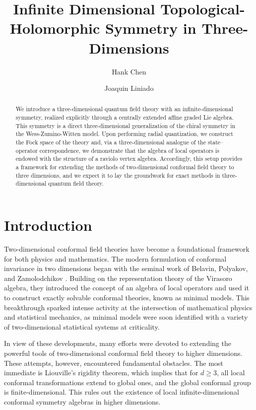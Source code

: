 \documentclass[11pt]{amsart}
\date{}
\title{Infinite Dimensional Topological-Holomorphic Symmetry in Three-Dimensions}
\author{Hank Chen}
\author{Joaquin Liniado}
\numberwithin{equation}{section}
\numberwithin{figure}{section}
\numberwithin{table}{section}
\theoremstyle{thm}
\numberwithin{equation}{subsection}
\theoremstyle{definition}
\theoremstyle{rem}
\begin{document}
	
\begin{abstract}

We introduce a three-dimensional quantum field theory with an infinite-dimensional symmetry, realized explicitly through a centrally extended affine graded Lie algebra. This symmetry is a direct three-dimensional generalization of the chiral symmetry in the Wess-Zumino-Witten model. Upon performing radial quantization, we construct the Fock space of the theory and, via a three-dimensional analogue of the state–operator correspondence, we demonstrate that the algebra of local operators is endowed with the structure of a raviolo vertex algebra. Accordingly, this setup provides a framework for extending the methods of two-dimensional conformal field theory to three dimensions, and we expect it to lay the groundwork for exact methods in three-dimensional quantum field theory.
	
\end{abstract}



\maketitle

\tableofcontents





\section{Introduction}

Two-dimensional conformal field theories have become a foundational framework for both physics and mathematics. The modern formulation of conformal invariance in two dimensions began with the seminal  work of Belavin, Polyakov, and Zamolodchikov \cite{Belavin:1984vu}. Building on the representation theory of the Virasoro algebra, they introduced the concept of an algebra of local operators and used it to construct exactly solvable conformal theories, known as minimal models. This breakthrough sparked intense activity at the intersection of mathematical physics and statistical mechanics, as minimal models were soon identified with a variety of two-dimensional statistical systems at criticality. 

In view of these developments, many efforts were devoted to extending the powerful tools of two-dimensional conformal field theory to higher dimensions. These attempts, however, encountered fundamental obstacles. The most immediate is Liouville’s rigidity theorem, which implies that for $d\geq 3$, all local conformal transformations extend to global ones, and the global conformal group is finite-dimensional. This rules out the existence of local infinite-dimensional conformal symmetry algebras in higher dimensions.
\end{document}
